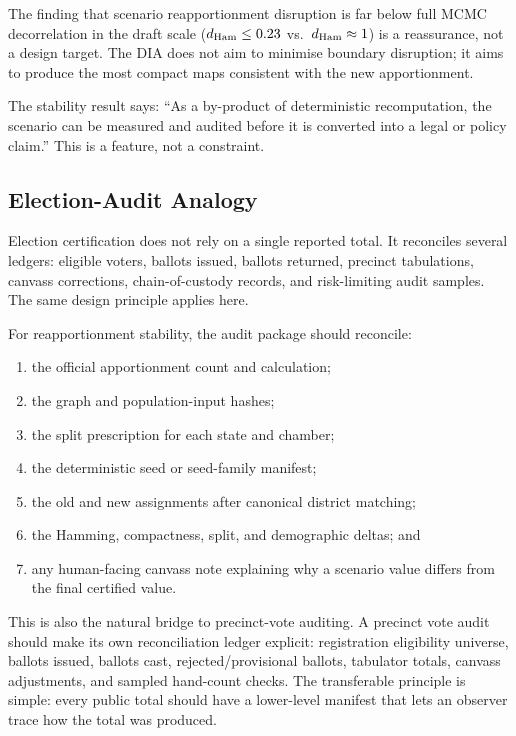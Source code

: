 The finding that scenario reapportionment disruption is far below full MCMC
decorrelation in the draft scale ($d_{\rm Ham} \leq 0.23$ vs.\
$d_{\rm Ham} \approx 1$) is a reassurance, not a design target.
The DIA does not aim to minimise boundary disruption; it aims to produce
the most compact maps consistent with the new apportionment.

The stability result says: ``As a by-product of deterministic recomputation,
the scenario can be measured and audited before it is converted into a legal
or policy claim.''
This is a feature, not a constraint.

\subsection{Election-Audit Analogy}

Election certification does not rely on a single reported total.  It reconciles
several ledgers: eligible voters, ballots issued, ballots returned, precinct
tabulations, canvass corrections, chain-of-custody records, and risk-limiting
audit samples.  The same design principle applies here.

For reapportionment stability, the audit package should reconcile:
\begin{enumerate}
\item the official apportionment count and \hh{} calculation;
\item the graph and population-input hashes;
\item the split prescription for each state and chamber;
\item the deterministic seed or seed-family manifest;
\item the old and new assignments after canonical district matching;
\item the Hamming, compactness, split, and demographic deltas; and
\item any human-facing canvass note explaining why a scenario value differs
      from the final certified value.
\end{enumerate}

This is also the natural bridge to precinct-vote auditing.  A precinct vote
audit should make its own reconciliation ledger explicit: registration
eligibility universe, ballots issued, ballots cast, rejected/provisional
ballots, tabulator totals, canvass adjustments, and sampled hand-count checks.
The transferable principle is simple: every public total should have a
lower-level manifest that lets an observer trace how the total was produced.

